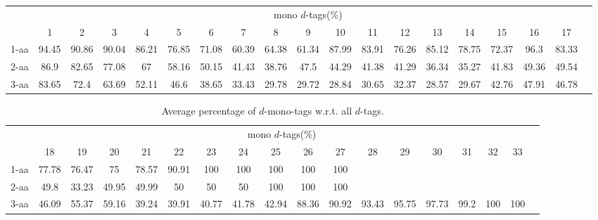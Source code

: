 \documentclass{article}
\begin{document}
\begin{table}[h]\tiny
\vspace{3mm}
{\centering
\begin{center}
\begin{tabular}{|l|c|c|c|c|c|c|c|c|c|c|c|c|c|c|c|c|c|c|}
  \hline
  & \multicolumn{ 17 }{|c|}{mono $d$-tags(\%)} \\
  \cline{2- 18}
    & 1 & 2 & 3 & 4 & 5 & 6 & 7 & 8 & 9 & 10 & 11 & 12 & 13 & 14 & 15 & 16 & 17\\
  \hline
1-aa  & 94.45 & 90.86 & 90.04 & 86.21 & 76.85 & 71.08 & 60.39 & 64.38 & 61.34 & 87.99 & 83.91 & 76.26 & 85.12 & 78.75 & 72.37 & 96.3 & 83.33\\
2-aa  & 86.9 & 82.65 & 77.08 & 67 & 58.16 & 50.15 & 41.43 & 38.76 & 47.5 & 44.29 & 41.38 & 41.29 & 36.34 & 35.27 & 41.83 & 49.36 & 49.54\\
3-aa  & 83.65 & 72.4 & 63.69 & 52.11 & 46.6 & 38.65 & 33.43 & 29.78 & 29.72 & 28.84 & 30.65 & 32.37 & 28.57 & 29.67 & 42.76 & 47.91 & 46.78\\
 \hline
\end{tabular}
\end{center}
\par}
\centering

\vspace{3mm}
\label{table:mono-d-tags}
\end{table}
\begin{table}[h]\tiny
\vspace{3mm}
{\centering
\begin{center}
\begin{tabular}{|l|c|c|c|c|c|c|c|c|c|c|c|c|c|c|c|c|c|}
  \hline
  & \multicolumn{ 16 }{|c|}{mono $d$-tags(\%)} \\
  \cline{2- 17}
    & 18 & 19 & 20 & 21 & 22 & 23 & 24 & 25 & 26 & 27 & 28 & 29 & 30 & 31 & 32 & 33\\
  \hline
1-aa  & 77.78 & 76.47 & 75 & 78.57 & 90.91 & 100 & 100 & 100 & 100 & 100 &  &  &  &  &  & \\
2-aa  & 49.8 & 33.23 & 49.95 & 49.99 & 50 & 50 & 50 & 100 & 100 & 100 &  &  &  &  &  & \\
3-aa  & 46.09 & 55.37 & 59.16 & 39.24 & 39.91 & 40.77 & 41.78 & 42.94 & 88.36 & 90.92 & 93.43 & 95.75 & 97.73 & 99.2 & 100 & 100\\
 \hline
\end{tabular}
\end{center}
\par}
\centering

\caption{ Average percentage of $d$-mono-tags w.r.t. all $d$-tags.}

\vspace{3mm}
\label{table:mono-d-tags}
\end{table}
\end{document}
